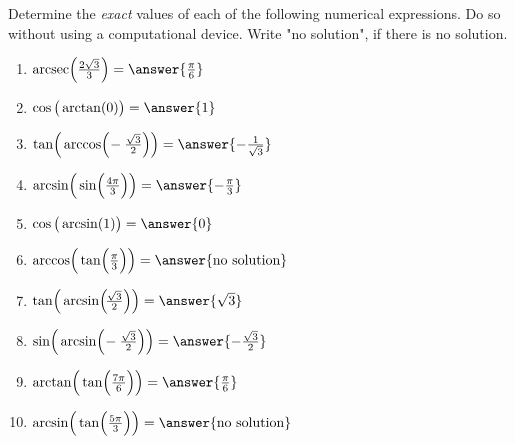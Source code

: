 \documentclass{ximera}
\author{Elizabeth Campolongo}
\begin{document}
\begin{exercise}

Determine the {\it exact} values of each of the following numerical expressions. Do so without using a computational device. Write "no solution", if there is no solution.
%


\begin{enumerate}
\item $\arcsec\!\Big(\frac{2\sqrt{3}}{3}\Big)= \answer{\frac{\pi}{6}}$
%
%
%
%
%
\item $\cos\big(\arctan(0)\big) = \answer{1}$
%
\item $\tan\!\Big(\arccos\!\Big(\!-\frac{\sqrt{3}}{2}\Big)\Big) = \answer{-\frac{1}{\sqrt{3}}}$
%
\item $\arcsin\!\Big(\sin\!\Big(\frac{4\pi}{3}\Big)\Big) = \answer{-\frac{\pi}{3}}$
%
\item $\cos\big(\arcsin(1)\big) = \answer{0}$
%
\item $\arccos\!\Big(\tan\!\Big(\frac{\pi}{3}\Big)\Big) = \answer{\text{no solution}}$
%
\item $\tan\!\Big(\arcsin\!\Big(\!\frac{\sqrt{3}}{2}\Big)\Big) = \answer{\sqrt{3}}$
%
\item $\sin\!\Big(\arcsin\!\Big(\!-\frac{\sqrt{3}}{2}\Big)\Big) = \answer{-\frac{\sqrt{3}}{2}}$
%
\item $\arctan\!\Big(\tan\!\Big(\frac{7\pi}{6}\Big)\Big) = \answer{\frac{\pi}{6}}$
%
\item $\arcsin\!\Big(\tan\!\Big(\frac{5\pi}{3}\Big)\Big) = \answer{\text{no solution}}$
%
\end{enumerate}
\end{exercise}
\end{document}
